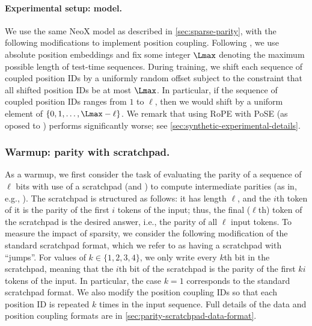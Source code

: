 \documentclass{article}
\begin{document}
\paragraph{Experimental setup: model.} 
We use the same NeoX model as described in \cref{sec:sparse-parity}, with the following modifications to implement position coupling. Following \cite{cho_position_2024,cho_arithmetic_2024,mcleish_transformers_2024}, we use absolute position embeddings %
and fix some integer $\Lmax$ denoting the maximum possible length of test-time sequences. During training, we shift each sequence of coupled position IDs by a uniformly random offset subject to the constraint that all shifted position IDs be at most $\Lmax$. In particular, if the sequence of coupled position IDs ranges from $1$ to $\ell$, then we would shift by a uniform element of $\{0, 1, \ldots, \Lmax - \ell \}$. We remark that using RoPE with PoSE (as oposed to \PPC) performs significantly worse; see \cref{sec:synthetic-experimental-details}. 



\subsubsection{Warmup: parity with scratchpad.}
\label{sec:parity-scratchpad}


  
As a warmup, we first consider the task of evaluating the parity of a sequence of $\ell$ bits with use of a scratchpad (and \PPC) to compute intermediate parities (as in, e.g., \citet{anil_exploring_2022,cho_arithmetic_2024}).
The scratchpad is structured as follows: it has length $\ell$, and the $i$th token of it is the parity of the first $i$ tokens of the input; thus, the final ($\ell$th) token of the scratchpad is the desired answer, i.e., the parity of all $\ell$ input tokens. 
To measure the impact of sparsity, we consider the following modification of the standard scratchpad format, which we refer to as having a scratchpad with ``jumps''. For values of $k \in \{1, 2, 3, 4 \}$, we only write every $k$th bit in the scratchpad, meaning that the $i$th bit of the scratchpad is the parity of the first $ki$ tokens of the input. In particular, the case $k=1$ corresponds to the standard scratchpad format. %
We also modify the position coupling IDs so that each position ID is repeated $k$ times in the input sequence. Full details of the data and position coupling formats are in \cref{sec:parity-scratchpad-data-format}. 
\end{document}
